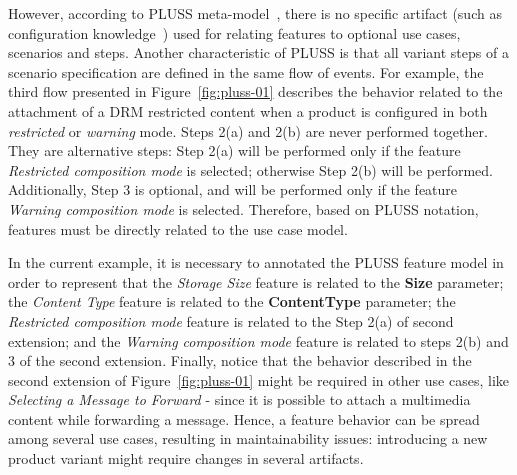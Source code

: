 \documentclass{acm_proc_article-sp}
\begin{document}
However, according to PLUSS meta-model~\cite{eriksson-splc-2005}, there is no specific artifact (such as configuration knowledge~\cite{czarnecki-book, phol-spl-book}) used for relating  features to optional use cases, scenarios and steps. Another characteristic of PLUSS is that all variant steps of a scenario specification are defined in the same flow of events. 
For example, the third flow presented in Figure~\ref{fig:pluss-01} describes the behavior related to the attachment of 
a DRM restricted content when a product is configured in both \emph{restricted} or \emph{warning} mode. Steps 2(a) and 2(b) are 
never performed together. They are alternative steps: Step 2(a) will be performed only if the feature \emph{Restricted composition 
mode} is selected; otherwise Step 2(b) will be performed. Additionally, Step 3 is optional, and will be performed only if the feature 
\emph{Warning composition mode} is selected. Therefore, based on PLUSS notation, features must be directly related to the use case 
model. 

In the current example, it is necessary to annotated the PLUSS feature model in order to represent that the 
\emph{Storage Size} feature is related to the {\bf Size} parameter; the \emph{Content Type} feature is related to the {\bf ContentType} parameter; the \emph{Restricted composition mode} feature is 
related to the Step 2(a) of second extension; and the \emph{Warning composition mode} feature is 
related to steps 2(b) and 3 of the second extension. Finally, notice that the behavior described in the second 
extension of Figure~\ref{fig:pluss-01} might be required in other use cases, like \emph{Selecting a Message to Forward} - 
since it is possible to attach a multimedia content while forwarding a message. Hence, a feature behavior can be spread 
among several use cases, resulting in maintainability issues: introducing a new product 
variant might require changes in several artifacts.
\end{document}
